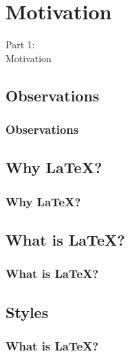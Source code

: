 {
\renewcommand{\bgcolor}{motivation}

\section{Motivation}
\begin{frame}
  \vspace{25mm}
  \begin{center}
    \Huge{Part 1:\\Motivation}
  \end{center}
\end{frame}

\subsection{Observations}
\begin{frame}[fragile]
  \frametitle{Observations}
  \vspace{3mm}
  
\end{frame}

\subsection{Why \LaTeX?}
\begin{frame}[fragile]
  \frametitle{Why \LaTeX?}
  \vspace{3mm}
  
\end{frame}

\subsection{What is \LaTeX?}
\begin{frame}[fragile]
  \frametitle{What is \LaTeX?}
  \vspace{3mm}
  
\end{frame}

\subsection{Styles}
\begin{frame}[fragile]
  \frametitle{What is \LaTeX? }
  \vspace{3mm}
  
\end{frame}

}

